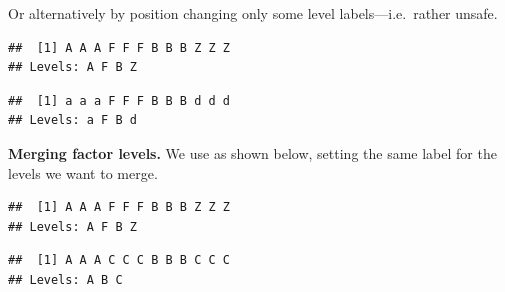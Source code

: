 \documentclass[krantz2]{krantz}\usepackage{knitr}%
\begin{document}
\begin{explainbox}
Or alternatively by position changing only some level labels---i.e.\ rather unsafe.
\begin{knitrout}\footnotesize
{}\color{fgcolor}\begin{kframe}
\begin{alltt}
 \hlkwb{<-} \hlstd{(}\hlstd{,} \hlstd{,}  \hlstd{=} \hlstd{(}\hlstd{,} \hlstd{,} \hlstd{,} \hlstd{))}
\end{alltt}
\begin{verbatim}
##  [1] A A A F F F B B B Z Z Z
## Levels: A F B Z
\end{verbatim}
\begin{alltt}
\hlstd{(my.factor1)[}\hlstd{(}\hlstd{,} \hlstd{)]} \hlkwb{<-} \hlstd{(}\hlstd{,} \hlstd{)}
\end{alltt}
\begin{verbatim}
##  [1] a a a F F F B B B d d d
## Levels: a F B d
\end{verbatim}
\end{kframe}
\end{knitrout}

\end{explainbox}

\begin{explainbox}
\textbf{Merging factor levels.} We use  as shown below, setting the same label for the levels we want to merge.
\begin{knitrout}\footnotesize
{}\color{fgcolor}\begin{kframe}
\begin{alltt}
 \hlkwb{<-} \hlstd{(}\hlstd{,} \hlstd{,}  \hlstd{=} \hlstd{(}\hlstd{,} \hlstd{,} \hlstd{,} \hlstd{))}
\end{alltt}
\begin{verbatim}
##  [1] A A A F F F B B B Z Z Z
## Levels: A F B Z
\end{verbatim}
\begin{alltt}
        \hlstd{=} \hlstd{(}\hlstd{,} \hlstd{,} \hlstd{,} \hlstd{),}
        \hlstd{=} \hlstd{(}\hlstd{,} \hlstd{,} \hlstd{,} \hlstd{))}
\end{alltt}
\begin{verbatim}
##  [1] A A A C C C B B B C C C
## Levels: A B C
\end{verbatim}
\end{kframe}
\end{knitrout}
\end{explainbox}
\end{document}
